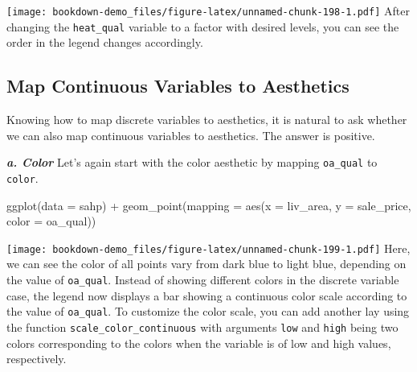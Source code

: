 \documentclass[
]{book}
\newenvironment{Shaded}{\begin{snugshade}}{\end{snugshade}}
\newcommand{\AttributeTok}[1]{\textcolor[rgb]{0.77,0.63,0.00}{#1}}
\newcommand{\DecValTok}[1]{\textcolor[rgb]{0.00,0.00,0.81}{#1}}
\newcommand{\FunctionTok}[1]{\textcolor[rgb]{0.00,0.00,0.00}{#1}}
\newcommand{\NormalTok}[1]{#1}
\newcommand{\OtherTok}[1]{\textcolor[rgb]{0.56,0.35,0.01}{#1}}
\newcommand{\SpecialCharTok}[1]{\textcolor[rgb]{0.00,0.00,0.00}{#1}}
\newcommand{\StringTok}[1]{\textcolor[rgb]{0.31,0.60,0.02}{#1}}
\begin{document}
\begin{Shaded}
\end{Shaded}

\texttt{[image: bookdown-demo\_files/figure-latex/unnamed-chunk-198-1.pdf]}
After changing the \texttt{heat\_qual} variable to a factor with desired levels, you can see the order in the legend changes accordingly.

\hypertarget{map-continous-aes}{%
\subsection{Map Continuous Variables to Aesthetics}\label{map-continous-aes}}

Knowing how to map discrete variables to aesthetics, it is natural to ask whether we can also map continuous variables to aesthetics. The answer is positive.

\textbf{\emph{a. Color}}
Let's again start with the color aesthetic by mapping \texttt{oa\_qual} to \texttt{color}.

\begin{Shaded}
\begin{Highlighting}[]
\FunctionTok{ggplot}\NormalTok{(}\AttributeTok{data =}\NormalTok{ sahp) }\SpecialCharTok{+} \FunctionTok{geom\_point}\NormalTok{(}\AttributeTok{mapping =} \FunctionTok{aes}\NormalTok{(}\AttributeTok{x =}\NormalTok{ liv\_area, }\AttributeTok{y =}\NormalTok{ sale\_price, }\AttributeTok{color =}\NormalTok{ oa\_qual))}
\end{Highlighting}
\end{Shaded}

\texttt{[image: bookdown-demo\_files/figure-latex/unnamed-chunk-199-1.pdf]}
Here, we can see the color of all points vary from dark blue to light blue, depending on the value of \texttt{oa\_qual}. Instead of showing different colors in the discrete variable case, the legend now displays a bar showing a continuous color scale according to the value of \texttt{oa\_qual}. To customize the color scale, you can add another lay using the function \texttt{scale\_color\_continuous} with arguments \texttt{low} and \texttt{high} being two colors corresponding to the colors when the variable is of low and high values, respectively.
\end{document}
